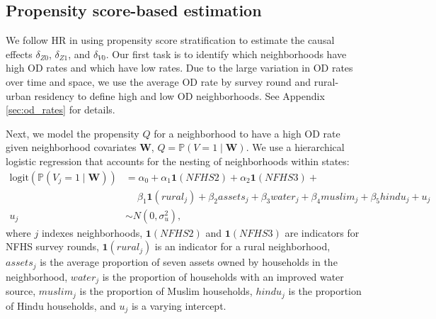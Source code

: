 \documentclass[12pt,a4paper,titlepage]{article}
\begin{document}
\subsection{Propensity score-based estimation}
We follow HR in using propensity score stratification to estimate the causal effects $\delta_{Z0}$, $\delta_{Z1}$, and $\delta_{V0}$. Our first task is to identify which neighborhoods have high OD rates and which have low rates. Due to the large variation in OD rates over time and space, we use the average OD rate by survey round and rural-urban residency to define high and low OD neighborhoods. See Appendix \ref{sec:od_rates} for details.

Next, we model the propensity $Q$ for a neighborhood to have a high OD rate given neighborhood covariates $\mathbf{W}$, $Q = \mathbb{P}(V=1 \mid \mathbf{W})$. We use a hierarchical logistic regression that accounts for the nesting of neighborhoods within states:
\begin{align*}
	\text{logit}(\mathbb{P}(V_j = 1 \mid \mathbf{W})) &= \alpha_0 + \alpha_1 \mathbf{1}(NFHS2) + \alpha_2 \mathbf{1}(NFHS3) + \\
	&\quad~ \beta_1 \mathbf{1}(rural_j) + \beta_2 assets_j + \beta_3 water_j + \beta_4 muslim_j + \beta_5 hindu_j + u_j \\
	u_j &\sim N(0, \sigma_u^2),
\end{align*}
where $j$ indexes neighborhoods, $\mathbf{1}(NFHS2)$ and $\mathbf{1}(NFHS3)$ are indicators for NFHS survey rounds, $\mathbf{1}(rural_j)$ is an indicator for a rural neighborhood, $assets_j$ is the average proportion of seven assets owned by households in the neighborhood, $water_j$ is the proportion of households with an improved water source, $muslim_j$ is the proportion of Muslim households, $hindu_j$ is the proportion of Hindu households, and $u_j$ is a varying intercept.



%
\end{document}
